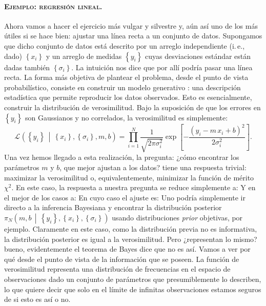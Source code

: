 \documentclass[a4paper,twoside]{article}
\newcommand{\pos}[2]{\ensuremath{\pi_N\left(#1\,\middle|\, #2\right)}\xspace}
\newcommand{\lik}[3][]{\ensuremath{\mathcal{L}_{#1}\left(#2\,\middle|\, #3\right)}\xspace}
\newcommand{\set}[1]{\ensuremath{\left\{#1\right\}}\xspace}
\begin{document}
\paragraph{\textsc{\color{Blue}Ejemplo: regresión lineal.}} Ahora vamos a hacer el ejercicio más
vulgar y silvestre y, aún así uno de los más útiles si se hace bien: ajustar una línea recta a un
conjunto de datos. Supongamos que dicho conjunto de datos está descrito por un arreglo independiente
(i.\,e., dado) $\set{x_i}$ y un arreglo de medidas $\set{y_i}$ cuyas desviaciones estándar están
dadas también $\set{\sigma_i}$.
La intuición nos dice que por allí podría pasar una línea recta. La forma más objetiva de plantear
el problema, desde el punto de vista probabilístico, consiste en construir un modelo generativo
\citep{Hogg2010}: una descripción estadística que permite reproducir los datos observados. Esto es
esencialmente, construir la distribución de verosimilitud. Bajo la suposición de que los errores en
$\set{y_i}$ son Gaussianos y no correlados, la verosimilitud es simplemente:
%
$$\lik{\set{y_i}}{\set{x_i},\set{\sigma_i},m,b} = \prod_{i=1}^N\frac{1}{\sqrt{2\pi\sigma_i^2}}\exp{\left[-\frac{\left(y_i-m\,x_i+b\right)^2}{2\sigma_i^2}\right]}.$$
%
Una vez hemos llegado a esta realización, la pregunta: ¿cómo encontrar los parámetros $m$ y $b$, que
mejor ajustan a los datos? tiene una respuesta trivial: maximizar la verosimilitud o,
equivalentemente, minimizar la función de mérito $\chi^2$. En este caso, la respuesta a nuestra
pregunta se reduce simplemente a:
Y en el mejor de los casos a:
En cuyo caso el ajuste es:
Uno podría simplemente ir directo a la inferencia Bayesiana y encontrar la distribución posterior
$\pos{m,b}{\set{y_i},\set{x_i},\set{\sigma_i}}$ usando distribuciones \emph{prior} objetivas, por
ejemplo.
Claramente en este caso, como la distribución previa no es informativa, la distribución posterior es
igual a la verosimilitud. Pero ¿representan lo mismo? bueno, evidentemente el teorema de Bayes dice
que no es así. Vamos a ver por qué desde el punto de vista de la información que se poseen. La
función de verosimilitud representa una distribución de frecuencias en el espacio de observaciones
dado un conjunto de parámetros que presumiblemente lo describen, lo que quiere decir que solo en el
límite de infinitas observaciones estamos seguros de si esto es así o no.
\end{document}
